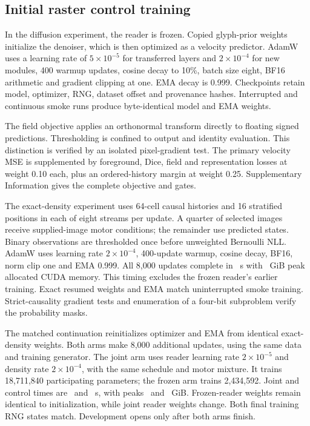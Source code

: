 \subsection*{Initial raster control training}
In the diffusion experiment, the reader is frozen. Copied glyph-prior weights initialize the denoiser,
which is then optimized as a velocity predictor. AdamW uses a learning rate of
$5\times10^{-5}$ for transferred layers and $2\times10^{-4}$ for new modules,
400 warmup updates, cosine decay to 10\%, batch size eight, BF16 arithmetic and
gradient clipping at one. EMA decay is 0.999. Checkpoints retain model,
optimizer, RNG, dataset offset and provenance hashes. Interrupted and
continuous smoke runs produce byte-identical model and EMA weights.

The field objective applies an orthonormal transform directly to floating
signed predictions. Thresholding is confined to output and identity
evaluation. This distinction is verified by an isolated pixel-gradient test.
The primary velocity MSE is supplemented by foreground, Dice, field and
representation losses at weight 0.10 each, plus an ordered-history margin at
weight 0.25. Supplementary Information gives the complete objective and gates.

The exact-density experiment uses 64-cell causal histories and 16 stratified
positions in each of eight streams per update. A quarter of selected images
receive supplied-image motor conditions; the remainder use predicted states.
Binary observations are thresholded once before unweighted Bernoulli NLL.
AdamW uses learning rate $2\times10^{-4}$, 400-update warmup, cosine decay,
BF16, norm clip one and EMA 0.999. All 8,000 updates complete in
\DensitySeconds\ s with \DensityMemory\ GiB peak allocated CUDA memory.
This timing excludes the frozen reader's earlier training. Exact resumed
weights and EMA match uninterrupted smoke training. Strict-causality gradient
tests and enumeration of a four-bit subproblem verify the probability masks.

The matched continuation reinitializes optimizer and EMA from identical
exact-density weights. Both arms make 8,000 additional updates, using the same
data and training generator. The joint arm uses reader learning rate
$2\times10^{-5}$ and density rate $2\times10^{-4}$, with the same schedule and
motor mixture. It trains 18,711,840 participating parameters; the frozen arm
trains 2,434,592. Joint and control times are \JointTime\ and \ControlTime\ s,
with peaks \JointMemory\ and \ControlMemory\ GiB. Frozen-reader weights remain
identical to initialization, while joint reader weights change. Both final
training RNG states match. Development opens only after both arms finish.

